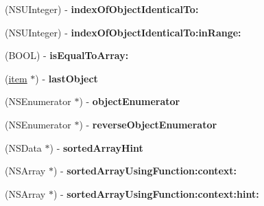 \begin{DoxyCompactItemize}
\item 
\hypertarget{interfaceget_items_by_s_s_c_c_response_a49f91b73a40fbd7514a4daac7d4b276c}{}(N\+S\+U\+Integer) -\/ {\bfseries index\+Of\+Object\+Identical\+To\+:}\label{interfaceget_items_by_s_s_c_c_response_a49f91b73a40fbd7514a4daac7d4b276c}

\item 
\hypertarget{interfaceget_items_by_s_s_c_c_response_a5b04f7172e28fab467af6fd137c7224d}{}(N\+S\+U\+Integer) -\/ {\bfseries index\+Of\+Object\+Identical\+To\+:in\+Range\+:}\label{interfaceget_items_by_s_s_c_c_response_a5b04f7172e28fab467af6fd137c7224d}

\item 
\hypertarget{interfaceget_items_by_s_s_c_c_response_adc80ff99aba6b7984a9ae59a50ccbe9e}{}(B\+O\+O\+L) -\/ {\bfseries is\+Equal\+To\+Array\+:}\label{interfaceget_items_by_s_s_c_c_response_adc80ff99aba6b7984a9ae59a50ccbe9e}

\item 
\hypertarget{interfaceget_items_by_s_s_c_c_response_a6d83cb31755b1372d970bae2b8159716}{}(\hyperlink{interfaceitem}{item} $\ast$) -\/ {\bfseries last\+Object}\label{interfaceget_items_by_s_s_c_c_response_a6d83cb31755b1372d970bae2b8159716}

\item 
\hypertarget{interfaceget_items_by_s_s_c_c_response_aa330ef073639ba6410d9e6c01db0fd05}{}(N\+S\+Enumerator $\ast$) -\/ {\bfseries object\+Enumerator}\label{interfaceget_items_by_s_s_c_c_response_aa330ef073639ba6410d9e6c01db0fd05}

\item 
\hypertarget{interfaceget_items_by_s_s_c_c_response_a0371b4e05beccb5993783e2f8c8ac0fd}{}(N\+S\+Enumerator $\ast$) -\/ {\bfseries reverse\+Object\+Enumerator}\label{interfaceget_items_by_s_s_c_c_response_a0371b4e05beccb5993783e2f8c8ac0fd}

\item 
\hypertarget{interfaceget_items_by_s_s_c_c_response_a90bf9b3caf53a35e94a1987a5f6c1de4}{}(N\+S\+Data $\ast$) -\/ {\bfseries sorted\+Array\+Hint}\label{interfaceget_items_by_s_s_c_c_response_a90bf9b3caf53a35e94a1987a5f6c1de4}

\item 
\hypertarget{interfaceget_items_by_s_s_c_c_response_acaa7897478ec872fbb17d4f0521e1374}{}(N\+S\+Array $\ast$) -\/ {\bfseries sorted\+Array\+Using\+Function\+:context\+:}\label{interfaceget_items_by_s_s_c_c_response_acaa7897478ec872fbb17d4f0521e1374}

\item 
\hypertarget{interfaceget_items_by_s_s_c_c_response_a97173ae567844db39fa55664ade3c70c}{}(N\+S\+Array $\ast$) -\/ {\bfseries sorted\+Array\+Using\+Function\+:context\+:hint\+:}\label{interfaceget_items_by_s_s_c_c_response_a97173ae567844db39fa55664ade3c70c}


\end{DoxyCompactItemize}
